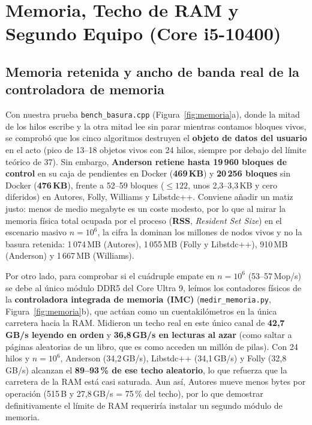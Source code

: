 \documentclass[11pt,a4paper]{article}
\begin{document}
\section{Memoria, Techo de RAM y Segundo Equipo (Core i5-10400)}

\subsection{Memoria retenida y ancho de banda real de la controladora de memoria}
Con nuestra prueba \texttt{bench\_basura.cpp} (Figura~\ref{fig:memoria}a), donde la mitad de los hilos escribe y la otra mitad lee sin parar mientras contamos bloques vivos, se comprobó que los cinco algoritmos destruyen el \textbf{objeto de datos del usuario} en el acto (pico de 13--18 objetos vivos con 24 hilos, siempre por debajo del límite teórico de 37). Sin embargo, \textbf{Anderson retiene hasta 19\,960 bloques de control} en su caja de pendientes en Docker (\textbf{469\,KB}) y \textbf{20\,256 bloques} sin Docker (\textbf{476\,KB}), frente a 52--59 bloques ($\le 122$, unos 2,3--3,3\,KB y cero diferidos) en Autores, Folly, Williams y Libstdc++. Conviene añadir un matiz justo: menos de medio megabyte es un coste modesto, por lo que al mirar la memoria física total ocupada por el proceso (\textbf{RSS}, \emph{Resident Set Size}) en el escenario masivo $n=10^6$, la cifra la dominan los millones de nodos vivos y no la basura retenida: 1\,074\,MB (Autores), 1\,055\,MB (Folly y Libstdc++), 910\,MB (Anderson) y 1\,667\,MB (Williams).

Por otro lado, para comprobar si el cuádruple empate en $n=10^6$ (53--57\,Mop/s) se debe al único módulo DDR5 del Core Ultra 9, leímos los contadores físicos de la \textbf{controladora integrada de memoria (IMC)} (\texttt{medir\_memoria.py}, Figura~\ref{fig:memoria}b), que actúan como un cuentakilómetros en la única carretera hacia la RAM. Midieron un techo real en este único canal de \textbf{42,7\,GB/s leyendo en orden} y \textbf{36,8\,GB/s en lecturas al azar} (como saltar a páginas aleatorias de un libro, que es como acceden un millón de pilas). Con 24 hilos y $n=10^6$, Anderson (34,2\,GB/s), Libstdc++ (34,1\,GB/s) y Folly (32,8\,GB/s) alcanzan el \textbf{89--93\,\% de ese techo aleatorio}, lo que refuerza que la carretera de la RAM está casi saturada. Aun así, Autores mueve menos bytes por operación (515\,B y 27,8\,GB/s = 75\,\% del techo), por lo que demostrar definitivamente el límite de RAM requeriría instalar un segundo módulo de memoria.
\end{document}
